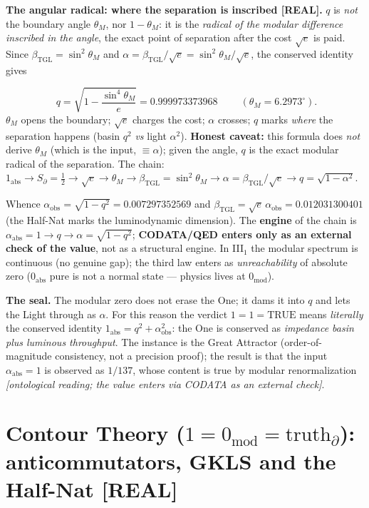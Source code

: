 \documentclass[11pt]{article}
\newcommand{\bTGL}{\beta_{\mathrm{TGL}}}\newcommand{\Msun}{M_{\odot}}\newcommand{\TGL}{\mathrm{TGL}}
\theoremstyle{definition}\newtheorem{deriv}{Derivation}
\begin{document}
\textbf{The angular radical: where the separation is inscribed \textsf{[REAL]}.} $q$ is \emph{not} the boundary angle $\theta_M$, nor $1-\theta_M$: it is the \emph{radical of the modular difference inscribed in the angle}, the exact point of separation after the cost $\sqrt e$ is paid. Since $\bTGL=\sin^2\theta_M$ and $\alpha=\bTGL/\sqrt e=\sin^2\theta_M/\sqrt e$, the conserved identity gives

\begin{equation}\boxed{\;q=\sqrt{1-\frac{\sin^4\theta_M}{e}}=0.999973373968\;}\qquad(\theta_M=6.2973^\circ).\end{equation}\noindent $\theta_M$ opens the boundary; $\sqrt e$ charges the cost; $\alpha$ crosses; $q$ marks \emph{where} the separation happens (basin $q^2$ \emph{vs} light $\alpha^2$). \textbf{Honest caveat:} this formula does \emph{not} derive $\theta_M$ (which is the input, $\equiv\alpha$); given the angle, $q$ is the exact modular radical of the separation. The chain: $1_{\mathrm{abs}}\to S_\partial=\tfrac12\to\sqrt e\to\theta_M\to\bTGL=\sin^2\theta_M\to\alpha=\bTGL/\sqrt e\to q=\sqrt{1-\alpha^2}$.

Whence $\alpha_{\mathrm{obs}}=\sqrt{1-q^2}=0.007297352569$ and $\bTGL=\sqrt e\,\alpha_{\mathrm{obs}}=0.012031300401$ (the Half-Nat marks the luminodynamic dimension). The \textbf{engine} of the chain is $\alpha_{\mathrm{abs}}=1\to q\to\alpha=\sqrt{1-q^2}$; \textbf{CODATA/QED enters only as an external check of the value}, not as a structural engine. In \mbox{III$_1$} the modular spectrum is continuous (no genuine gap); the third law enters as \emph{unreachability} of absolute zero ($0_{\mathrm{abs}}$ pure is not a normal state --- physics lives at $0_{\mathrm{mod}}$).

\textbf{The seal.} The modular zero does not erase the One; it dams it into $q$ and lets the Light through as $\alpha$. For this reason the verdict $\boxed{1=1=\mathrm{TRUE}}$ means \emph{literally} the conserved identity $1_{\mathrm{abs}}=q^2+\alpha_{\mathrm{obs}}^2$: the One is conserved as \emph{impedance basin plus luminous throughput}. The instance is the Great Attractor (order-of-magnitude consistency, not a precision proof); the result is that the input $\alpha_{\mathrm{abs}}=1$ is observed as $1/137$, whose content is true by modular renormalization \emph{[ontological reading; the value enters via CODATA as an external check]}.

\section{Contour Theory ($1=0_{\mathrm{mod}}=\mathrm{truth}_\partial$): anticommutators, GKLS and the Half-Nat \textsf{[REAL]}}
\end{document}
